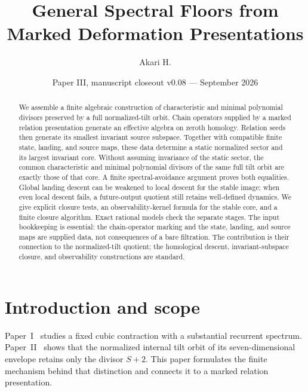 \documentclass[11pt]{amsart}
\title[General Spectral Floors]{General Spectral Floors from Marked Deformation Presentations}
\author{Akari H.}
\date{Paper III, manuscript closeout v0.08 --- September 2026}
\theoremstyle{definition}
\begin{document}
\begin{abstract}
We assemble a finite algebraic construction of characteristic and minimal polynomial
divisors preserved by a full normalized-tilt orbit. Chain operators supplied by a marked
relation presentation generate an effective algebra on zeroth homology. Relation seeds
then generate its smallest invariant source subspace. Together with compatible finite
state, landing, and source maps, these data determine a static normalized sector and its largest invariant core.
Without assuming invariance of the static sector, the common characteristic and minimal
polynomial divisors of the same full tilt orbit are exactly those of that core.
A finite spectral-avoidance argument proves both equalities.
Global landing descent can be weakened to local descent for the stable image;
when even local descent fails, a future-output quotient still retains well-defined dynamics.
We give explicit closure tests, an observability-kernel formula for the stable core,
and a finite closure algorithm. Exact rational models check the separate stages.
The input bookkeeping is essential: the chain-operator marking and the state,
landing, and source maps are supplied data, not consequences of a bare filtration.
The contribution is their connection to the normalized-tilt quotient; the homological
descent, invariant-subspace closure, and observability constructions are standard.
\end{abstract}
\maketitle

\tableofcontents

\section{Introduction and scope}

Paper~I~\cite{PaperI} studies a fixed cubic contraction with a substantial recurrent
spectrum. Paper~II~\cite{PaperII} shows that the normalized internal tilt orbit of its
seven-dimensional envelope retains only the divisor \(S+2\). This paper formulates
the finite mechanism behind that distinction and connects it to a marked relation
presentation.
\end{document}
